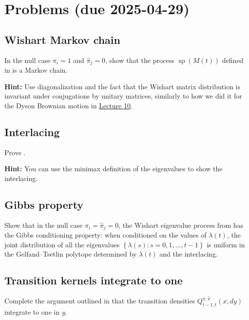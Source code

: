 \documentclass[letterpaper,11pt,oneside,reqno]{article}
\numberwithin{equation}{section}
\theoremstyle{definition}
\begin{document}
\appendix
\setcounter{section}{12}

\section{Problems (due 2025-04-29)}

\subsection{Wishart Markov chain}
\label{prob:Markov}

In the null case $\pi_i = 1$ and $\hat\pi_j = 0$,
show that the
process $\operatorname{sp}(M(t))$
defined in 
is a Markov chain.

\medskip
\noindent
\textbf{Hint:} Use diagonalization and
the fact that the Wishart matrix distribution is invariant under
conjugations by unitary matrices,
similarly to how we did it for the Dyson Brownian motion in
\href{https://lpetrov.cc/rmt25/rmt25-notes/rmt2025-l10.pdf}{Lecture 10}.


\subsection{Interlacing}
\label{prob:interlacing}

Prove .

\medskip
\noindent
\textbf{Hint:} You can use the minimax definition of the eigenvalues to show the interlacing.

\subsection{Gibbs property}
\label{prob:Gibbs}

Show that in the null case \(\pi_i = \hat\pi_j = 0\), the
Wishart eigenvalue process
from 
has the Gibbs conditioning property:
when conditioned on the values of
$\lambda(t)$, the joint distribution of
all the eigenvalues
$\left\{ \lambda(s)\colon s=0,1,\ldots,t-1  \right\}$
is uniform in the Gelfand--Tsetlin polytope
determined by $\lambda(t)$ and the interlacing.


\subsection{Transition kernels integrate to one}
\label{prob:CauchyBinet}

Complete the argument outlined in 
that the transition densities $Q^{\pi,\hat\pi}_{t-1,t}(x,dy)$
integrate to one in $y$.
\end{document}
